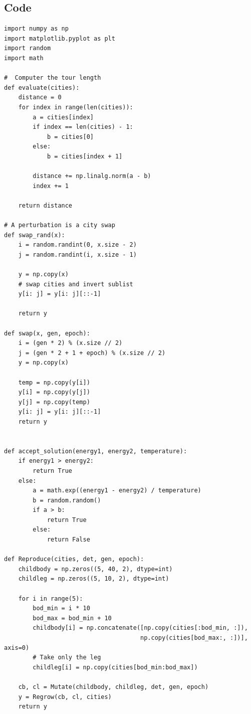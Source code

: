 \documentclass[12pt]{article}
\begin{document}
$$$$

\begin{center}

\label{fig:starfish_results}
\end{center}

\newpage
\subsection{Code}
\begin{lstlisting}
import numpy as np
import matplotlib.pyplot as plt
import random
import math

#  Computer the tour length
def evaluate(cities):
    distance = 0
    for index in range(len(cities)):
        a = cities[index]
        if index == len(cities) - 1:
            b = cities[0]
        else:
            b = cities[index + 1]

        distance += np.linalg.norm(a - b)
        index += 1

    return distance

# A perturbation is a city swap
def swap_rand(x):
    i = random.randint(0, x.size - 2)
    j = random.randint(i, x.size - 1)

    y = np.copy(x)
    # swap cities and invert sublist
    y[i: j] = y[i: j][::-1]

    return y

def swap(x, gen, epoch):
    i = (gen * 2) % (x.size // 2)
    j = (gen * 2 + 1 + epoch) % (x.size // 2)
    y = np.copy(x)

    temp = np.copy(y[i])
    y[i] = np.copy(y[j])
    y[j] = np.copy(temp)
    y[i: j] = y[i: j][::-1]
    return y


def accept_solution(energy1, energy2, temperature):
    if energy1 > energy2:
        return True
    else:
        a = math.exp((energy1 - energy2) / temperature)
        b = random.random()
        if a > b:
            return True
        else:
            return False

def Reproduce(cities, det, gen, epoch):
    childbody = np.zeros((5, 40, 2), dtype=int)
    childleg = np.zeros((5, 10, 2), dtype=int)

    for i in range(5):
        bod_min = i * 10
        bod_max = bod_min + 10
        childbody[i] = np.concatenate([np.copy(cities[:bod_min, :]),
                                      np.copy(cities[bod_max:, :])], axis=0)
        # Take only the leg
        childleg[i] = np.copy(cities[bod_min:bod_max])

    cb, cl = Mutate(childbody, childleg, det, gen, epoch)
    y = Regrow(cb, cl, cities)
    return y


\end{lstlisting}
\end{document}
